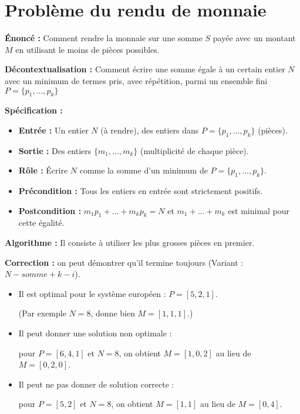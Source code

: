 \section{Problème du rendu de monnaie}

{\bfseries Énoncé :} Comment rendre la monnaie sur une somme $S$ payée avec un montant $M$ en utilisant le moins de pièces possibles.

\medskip

{\bfseries Décontextualisation :} Comment écrire une somme égale à un certain entier $N$ avec un minimum de termes pris, avec répétition, parmi un ensemble fini $P=\{p_1,\ldots,p_k\}$

\medskip
{\bfseries Spécification :} 

\begin{itemize}
	\item {\bfseries Entrée :} Un entier $N$ (à rendre), des entiers dans $P=\{p_1,\ldots,p_k\}$ (pièces).
	\item {\bfseries Sortie :} Des entiers $\{m_1,\ldots,m_k\}$ (multiplicité de chaque pièce).
	\item {\bfseries Rôle :} Écrire $N$ comme la somme d'un minimum de $P=\{p_1,\ldots,p_k\}$.
	\item {\bfseries Précondition :} Tous les entiers en entrée sont strictement positifs.
	\item {\bfseries Postcondition :} $m_1 p_1 + \ldots + m_k p_k =N$ et $m_1 + ... + m_k$ est minimal pour cette égalité.
\end{itemize}

\medskip
{\bfseries Algorithme :} Il consiste à utiliser les plus grosses pièces en premier.


\begin{algorithm}[H]
\end{algorithm}

{\bfseries Correction :} on peut démontrer qu'il termine toujours (Variant : $N-somme + k-i$).

\begin{itemize}
	\item Il est optimal pour le système européen : $P = [5, 2, 1]$. 
	
	(Par exemple $N=8$, donne bien $M=[1,1,1]$.)
	\item Il peut donner une solution non optimale : 
	
	pour $P = [6, 4, 1]$ et $N=8$, on obtient $M=[1,0,2]$ au lieu de $M=[0,2,0]$.
	\item Il peut ne pas donner de solution correcte : 
	
	pour $P = [5, 2]$ et $N=8$, on obtient $M=[1,1]$ au lieu de $M=[0,4]$.
\end{itemize}


